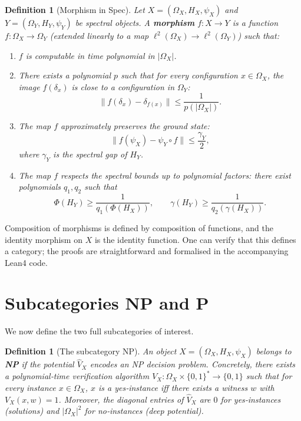 \documentclass[11pt,a4paper]{article}
\newtheorem{definition}[theorem]{Definition}
\begin{document}
\begin{definition}[Morphism in Spec]
Let $X = (\Omega_X, H_X, \psi_X)$ and $Y = (\Omega_Y, H_Y, \psi_Y)$ be spectral objects. A \textbf{morphism} $f: X \to Y$ is a function $f: \Omega_X \to \Omega_Y$ (extended linearly to a map $\ell^2(\Omega_X) \to \ell^2(\Omega_Y)$) such that:
\begin{enumerate}
\item $f$ is computable in time polynomial in $|\Omega_X|$.
\item There exists a polynomial $p$ such that for every configuration $x \in \Omega_X$, the image $f(\delta_x)$ is close to a configuration in $\Omega_Y$:
   \[
   \| f(\delta_x) - \delta_{f(x)} \| \le \frac{1}{p(|\Omega_X|)}.
   \]
\item The map $f$ approximately preserves the ground state:
   \[
   \| f(\psi_X) - \psi_Y \circ f \| \le \frac{\gamma_Y}{2},
   \]
   where $\gamma_Y$ is the spectral gap of $H_Y$.
\item The map $f$ respects the spectral bounds up to polynomial factors: there exist polynomials $q_1, q_2$ such that
   \[
   \Phi(H_Y) \ge \frac{1}{q_1(\Phi(H_X))},\qquad \gamma(H_Y) \ge \frac{1}{q_2(\gamma(H_X))}.
   \]
\end{enumerate}
\end{definition}

Composition of morphisms is defined by composition of functions, and the identity morphism on $X$ is the identity function. One can verify that this defines a category; the proofs are straightforward and formalised in the accompanying Lean4 code.

\section{Subcategories NP and P}

We now define the two full subcategories of interest.

\begin{definition}[The subcategory NP]
An object $X = (\Omega_X, H_X, \psi_X)$ belongs to \textbf{NP} if the potential $\hat{V}_X$ encodes an NP decision problem. Concretely, there exists a polynomial‑time verification algorithm $V_X: \Omega_X \times \{0,1\}^* \to \{0,1\}$ such that for every instance $x \in \Omega_X$, $x$ is a yes‑instance iff there exists a witness $w$ with $V_X(x,w) = 1$. Moreover, the diagonal entries of $\hat{V}_X$ are $0$ for yes‑instances (solutions) and $|\Omega_X|^2$ for no‑instances (deep potential).
\end{definition}
\end{document}
